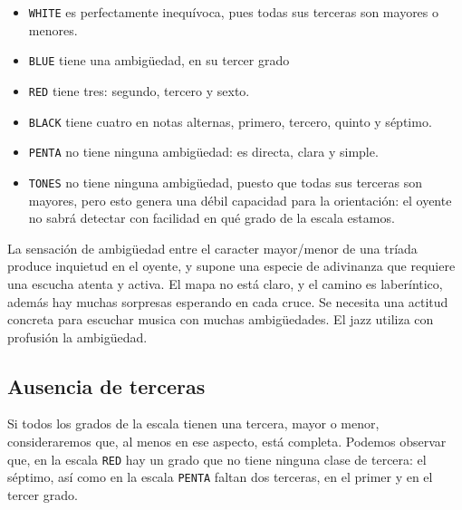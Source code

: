 \documentclass[]{report}
\providecommand{\tightlist}{%
  \setlength{
\itemsep}{0pt}\setlength{\parskip}{0pt}}
\begin{document}
\begin{itemize}   \tightlist
  \item  \texttt{WHITE} es perfectamente inequívoca, pues todas sus terceras         son mayores o menores.
  \item  \texttt{BLUE} tiene una ambigüedad, en su tercer grado
  \item  \texttt{RED} tiene tres: segundo, tercero y sexto.
  \item  \texttt{BLACK} tiene cuatro en notas alternas, primero, tercero,         quinto y séptimo.
  \item  \texttt{PENTA} no tiene ninguna ambigüedad: es directa, clara y         simple.
  \item  \texttt{TONES} no tiene ninguna ambigüedad, puesto que todas sus         terceras son mayores, pero esto genera una débil capacidad para la         orientación: el oyente no sabrá detectar con facilidad en qué grado de         la escala estamos.
\end{itemize}

La sensación de ambigüedad entre el caracter mayor/menor de una tríada produce inquietud en el oyente, y supone una especie de adivinanza que requiere una escucha atenta y activa. El mapa no está claro, y el camino es laberíntico, además hay muchas sorpresas esperando en cada cruce. Se necesita una actitud concreta para escuchar musica con muchas ambigüedades. El jazz utiliza con profusión la ambigüedad.

\subsection{Ausencia de terceras}

Si todos los grados de la escala tienen una tercera, mayor o menor, consideraremos que, al menos en ese aspecto, está completa. Podemos observar que, en la escala \texttt{RED} hay un grado que no tiene ninguna clase de tercera: el séptimo, así como en la escala \texttt{PENTA} faltan dos terceras, en el primer y en el tercer grado.
\end{document}
